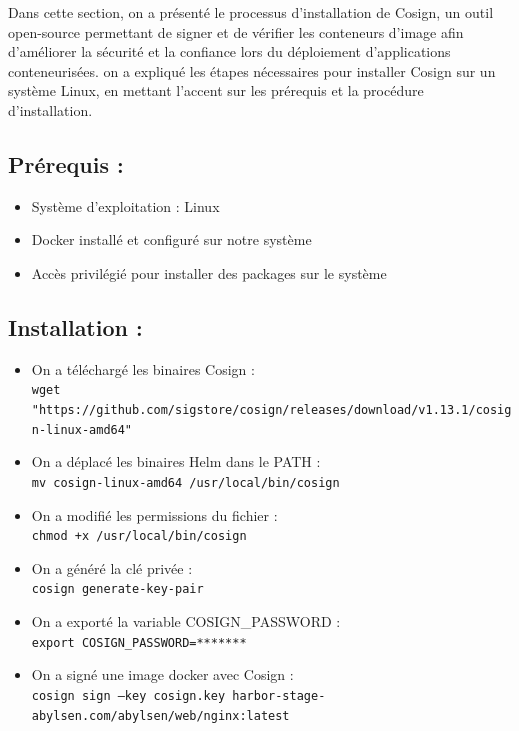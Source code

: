Dans cette section, on a présenté le processus d’installation de Cosign, un outil open-source permettant de signer et de vérifier les conteneurs d’image afin d’améliorer la sécurité et la confiance lors du déploiement d’applications conteneurisées. on a expliqué les étapes nécessaires pour installer Cosign sur un système Linux, en mettant l’accent sur les prérequis et la procédure d’installation.

\subsection*{Prérequis :}

\begin{itemize}
\item Système d’exploitation : Linux
\item Docker installé et configuré sur notre système
\item Accès privilégié pour installer des packages sur le système
\end{itemize}
\subsection*{Installation :}

\begin{itemize}
\item On a téléchargé les binaires Cosign : \\
\texttt{wget "https://github.com/sigstore/cosign/releases/download/v1.13.1/cosign-linux-amd64"}

\item On a déplacé les binaires Helm dans le PATH : \\
\texttt{mv cosign-linux-amd64 /usr/local/bin/cosign}

\item On a modifié les permissions du fichier : \\
\texttt{chmod +x /usr/local/bin/cosign}

\item On a généré la clé privée : \\
\texttt{cosign generate-key-pair}

\item On a exporté la variable COSIGN\_PASSWORD : \\
\texttt{export COSIGN\_PASSWORD=*******}

\item On a signé une image docker avec Cosign : \\
\texttt{cosign sign --key cosign.key harbor-stage-abylsen.com/abylsen/web/nginx:latest}
\end{itemize}

